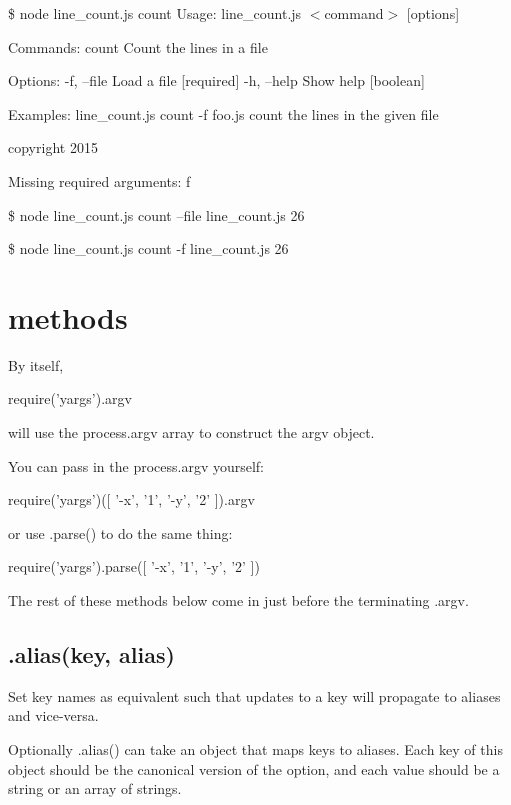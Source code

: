  \$ node line\+\_\+count.\+js count Usage\+: line\+\_\+count.\+js $<$command$>$ \mbox{[}options\mbox{]}

Commands\+: count Count the lines in a file

Options\+: -\/f, --file Load a file \mbox{[}required\mbox{]} -\/h, --help Show help \mbox{[}boolean\mbox{]}

Examples\+: line\+\_\+count.\+js count -\/f foo.\+js count the lines in the given file

copyright 2015

Missing required arguments\+: f

\$ node line\+\_\+count.\+js count --file line\+\_\+count.\+js 26

\$ node line\+\_\+count.\+js count -\/f line\+\_\+count.\+js 26

\section*{methods }

By itself,


\begin{DoxyCode}
require('yargs').argv
\end{DoxyCode}


will use the {\ttfamily process.\+argv} array to construct the {\ttfamily argv} object.

You can pass in the {\ttfamily process.\+argv} yourself\+:


\begin{DoxyCode}
require('yargs')([ '-x', '1', '-y', '2' ]).argv
\end{DoxyCode}


or use {\ttfamily .parse()} to do the same thing\+:


\begin{DoxyCode}
require('yargs').parse([ '-x', '1', '-y', '2' ])
\end{DoxyCode}


The rest of these methods below come in just before the terminating {\ttfamily .argv}.

\subsection*{\label{_alias}%
.alias(key, alias) }

Set key names as equivalent such that updates to a key will propagate to aliases and vice-\/versa.

Optionally {\ttfamily .alias()} can take an object that maps keys to aliases. Each key of this object should be the canonical version of the option, and each value should be a string or an array of strings.

